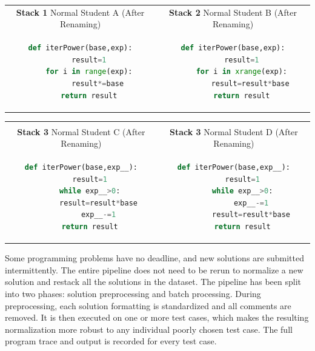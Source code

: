 \begin{tabular}{c|c}
{\bf Stack 1} Normal Student A (After Renaming) & {\bf Stack 2} Normal Student B (After Renaming)  \\
\begin{minipage}{0.5\linewidth}
\begin{lstlisting}[language=python,linebackgroundcolor={\lstcolorlines[lightyellow]{3,4}}]
def iterPower(base,exp):
    result=1
    for i in range(exp):
        result*=base
    return result
\end{lstlisting}
\end{minipage}
&
\begin{minipage}{0.5\linewidth}
\begin{lstlisting}[language=python,linebackgroundcolor={\lstcolorlines[lightyellow]{3,4}}]
def iterPower(base,exp):
    result=1
    for i in xrange(exp):
        result=result*base
    return result
\end{lstlisting}
\end{minipage}
\end{tabular}
\begin{tabular}{cc}
\hline
\\
{\bf Stack 3} Normal Student C (After Renaming) & {\bf Stack 3} Normal Student D (After Renaming)  \\
\begin{minipage}{0.5\linewidth}
\begin{lstlisting}[language=python,linebackgroundcolor={\lstcolorlines[mygray]{4,5}}]
def iterPower(base,exp__):
    result=1
    while exp__>0:
        result=result*base
        exp__-=1
    return result
\end{lstlisting}
\end{minipage}
&
\begin{minipage}{0.5\linewidth}
\begin{lstlisting}[language=python,linebackgroundcolor={\lstcolorlines[mygray]{4,5}}]
def iterPower(base,exp__):
    result=1
    while exp__>0:
        exp__-=1
        result=result*base
    return result
\end{lstlisting}
\end{minipage}
\end{tabular}

Some programming problems have no deadline, and new solutions are submitted intermittently. The entire pipeline does not need to be rerun to normalize a new solution and restack all the solutions in the dataset. The pipeline has been split into two phases: solution preprocessing and batch processing. During preprocessing, each solution formatting is standardized and all comments are removed. It is then executed on one or more test cases, which makes the resulting normalization more robust to any individual poorly chosen test case. The full program trace and output is recorded for every test case. 

